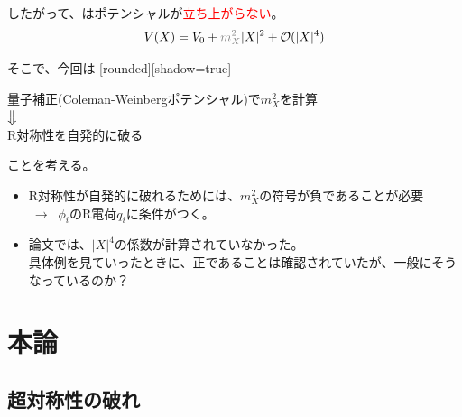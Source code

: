 \documentclass[
  unicode,a4paper,9pt,
  xcolor = {dvipsnames,svgnames},
  hyperref ={colorlinks=true,citecolor=Navy,linkcolor=NavyBlue,urlcolor=purple},
  ja=standard,lualatex
]{beamer}
\begin{document}
\begin{frame}
  \frametitle{\subsecname}

  したがって、はポテンシャルが\textcolor{red}{立ち上がらない}。
  \begin{equation}
    V(X)
    =
    V_{0}
    +
    \textcolor{gray}{m_{X}^2}|X|^2
    +
    \mathcal{O}(|X|^4)
    \nonumber
  \end{equation}

  \pause

  そこで、今回は
  [rounded][shadow=true]
  \begin{block}{}
    \centering
    量子補正(Coleman-Weinbergポテンシャル)で$m_{X}^2$を計算\\
    ${\big \Downarrow}$\\
    R対称性を自発的に破る
  \end{block}
  ことを考える。

  \begin{itemize}
    \item
          R対称性が自発的に破れるためには、$m_{X}^2$の符号が負であることが必要\\
          $\ \longrightarrow\ $ $\phi_i$のR電荷$q_{i}$に条件がつく。
    \item
          論文では、$|X|^4$の係数が計算されていなかった。\\
          具体例を見ていったときに、正であることは確認されていたが、一般にそうなっているのか？
  \end{itemize}

\end{frame}

\section{本論}

\begin{frame}[plain]
  \huge \secname
\end{frame}


\subsection{超対称性の破れ}
\end{document}
